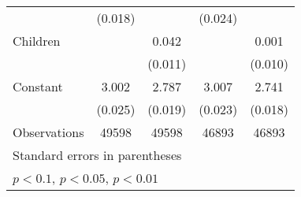 {\begin{tabular}{l*{4}{c}}
                    &     (0.018)         &                     &     (0.024)         &                     \\
Children            &                     &       0.042\sym{***}&                     &       0.001         \\
                    &                     &     (0.011)         &                     &     (0.010)         \\
Constant            &       3.002\sym{***}&       2.787\sym{***}&       3.007\sym{***}&       2.741\sym{***}\\
                    &     (0.025)         &     (0.019)         &     (0.023)         &     (0.018)         \\
\hline
Observations        &       49598         &       49598         &       46893         &       46893         \\
\hline\hline
\multicolumn{5}{l}{\footnotesize Standard errors in parentheses}\\
\multicolumn{5}{l}{\footnotesize \sym{*} \(p<0.1\), \sym{**} \(p<0.05\), \sym{***} \(p<0.01\)}\\
\end{tabular}
}
